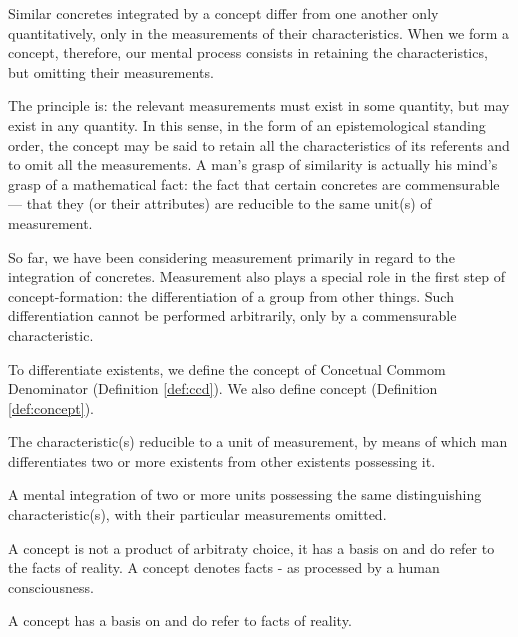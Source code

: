         Similar concretes integrated by a concept differ from one another only quantitatively, only in the measurements of their characteristics. When we form a concept, therefore, our mental process consists in retaining the characteristics, but omitting their measurements. 
        
        The principle is: the relevant measurements must exist in some quantity, but may exist in any quantity. In this sense, in the form of an epistemological standing order, the concept may be said to retain all the characteristics of its referents and to omit all the measurements. A man's grasp of similarity is actually his mind's grasp of a mathematical fact: the fact that certain concretes are commensurable — that they (or their attributes) are reducible to the same unit(s) of measurement.

        So far, we have been considering measurement primarily in regard to the integration of concretes. Measurement also plays a special role in the first step of concept-formation: the differentiation of a group from other things. Such differentiation cannot be performed arbitrarily, only by a commensurable characteristic. 
        
        To differentiate existents, we define the concept of Concetual Commom Denominator (Definition \ref{def:ccd}). We also define concept (Definition \ref{def:concept}).

            \begin{definition}
            \label{def:ccd}
                The characteristic(s) reducible to a unit of measurement, by means of which man differentiates two or more existents from other existents possessing it.
            \end{definition}

            \begin{definition}[Concept]
            \label{def:concept}
                A mental integration of two or more units possessing the same distinguishing characteristic(s), with their particular measurements omitted.
            \end{definition}

        A concept is not a product of arbitraty choice, it has a basis on and do refer to the facts of reality. A concept denotes facts - as processed by a human consciousness.

            \begin{theorem}
                A concept has a basis on and do refer to facts of reality.
            \end{theorem}

